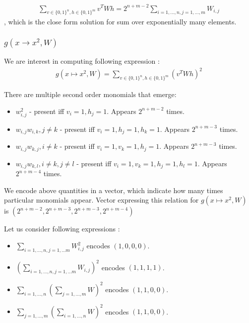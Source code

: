 \begin{gather*}
	\sum_{v \in \{0, 1\}^n, h \in \{0, 1\}^m} v^TWh = 2^{n + m - 2}\sum_{i = 1, \dots, n, j = 1, \dots, m} W_{i, j}
\end{gather*}
, which is the close form solution for sum over exponentially many elements.

\subsubsection{$g(x \rightarrow x^2, W)$}

We are interest in computing following expression : 
\begin{gather*}
	g(x \mapsto x^2, W) = \sum_{v \in \{0, 1\}^n, h \in \{0, 1\}^m} (v^TWh)^2
\end{gather*}

There are multiple second order monomials that emerge: 

\begin{itemize}
	\item $w_{i,j}^2$ - present iff $v_i = 1, h_j = 1$. Appears $2^{n + m - 2}$ times.
	\item $w_{i,j} w_{i, k}, j \neq k$ - present iff $v_i = 1, h_j = 1, h_k = 1$. Appears $2^{n + m - 3}$ times.	
	\item $w_{i,j} w_{k, j}, i \neq k$ - present iff $v_i = 1, v_k = 1, h_j = 1$. Appears $2^{n + m - 3}$ times.
	\item $w_{i,j} w_{k, l}, i \neq k, j \neq l$ - present iff $v_i = 1, v_k = 1, h_j = 1, h_l = 1$. Appears $2^{n + m - 4}$ times.			
\end{itemize}
We encode above quantities in a vector, which indicate how many times particular monomials 
appear. Vector expressing this relation for $g(x \mapsto x^2, W)$ is $(2^{n + m - 2}, 2^{n + m - 3}, 2^{n + m - 3}, 2^{n + m - 4})$


Let us consider following expressions : 
\begin{itemize}
 \item $\sum_{i = 1, \dots, n, j = 1, \dots m} W_{i, j}^2$ encodes $(1, 0, 0, 0)$. 
 \item $(\sum_{i = 1, \dots, n, j = 1, \dots m} W_{i, j})^2$ encodes $(1, 1, 1, 1)$.
 \item $\sum_{i = 1, \dots, n}(\sum_{j = 1, \dots, m} W)^2$ encodes $(1, 1, 0, 0)$. 
 \item $\sum_{j = 1, \dots, m}(\sum_{i = 1, \dots, n} W)^2$ encodes $(1, 1, 0, 0)$. 
\end{itemize}
 
